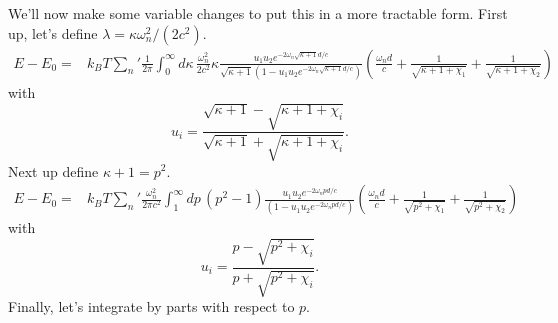 We'll now make some variable changes to put this in a more tractable form.
  First up, let's define $\lambda = \kappa \omega_n^2/(2c^2)$.  
\begin{align}
E-E_0%
=&k_BT{\sum_n}'\frac{1}{2\pi}\int_0^\infty d\kappa\,\frac{\omega_n^2}{2c^2} \kappa 
 \frac{u_1u_2 e^{-2\omega_n\sqrt{\kappa+1}d/c}}{\sqrt{\kappa+1}(1-u_1u_2 e^{-2\omega_n\sqrt{\kappa+1}d/c})}
\left( \frac{\omega_nd}{c} + \frac{1}{\sqrt{\kappa+1+\chi_1}} + \frac{1}{\sqrt{\kappa+1+\chi_2}} \right)
\end{align}
with
\begin{equation}
u_i = \frac{\sqrt{\kappa+1}-\sqrt{\kappa+1+\chi_i}}{\sqrt{\kappa +1}+\sqrt{\kappa+1+\chi_i}}.
\end{equation}
Next up define $\kappa+1 = p^2$.  
\begin{align}
E-E_0%
=&k_BT{\sum_n}'\frac{\omega_n^2}{2\pi c^2}\int_1^\infty dp\,(p^2-1)  
\frac{u_1u_2 e^{-2\omega_n pd/c}}{(1-u_1u_2 e^{-2\omega_npd/c})}
\left( \frac{\omega_nd}{c} + \frac{1}{\sqrt{p^2+\chi_1}} + \frac{1}{\sqrt{p^2+\chi_2}} \right)
\end{align}
with
\begin{equation}
u_i = \frac{p-\sqrt{p^2+\chi_i}}{p+\sqrt{p^2+\chi_i}}.
\end{equation}
Finally, let's integrate by parts with respect to $p$.  

